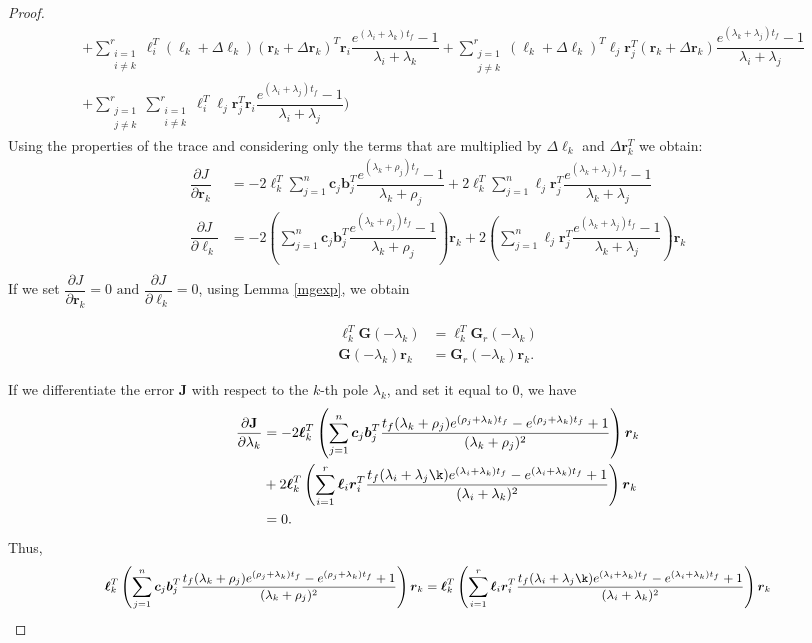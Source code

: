 \documentclass[preprint]{elsarticle}
\theoremstyle{definition}
\theoremstyle{definition}
\numberwithin{equation}{section}
\newcommand{\G}{\mathbf{G}}
\newcommand{\J}{\mathbf{J}}
\newcommand{\tf}{t_f}
\newcommand{\rc}{\boldsymbol{r}}
\newcommand{\lc}{\boldsymbol{\ell}}
\newcommand{\cc}{\boldsymbol{c}}
\newcommand{\bb}{\boldsymbol{b}}
\newcommand{\pder}[2][]{\dfrac{\partial#1}{\partial#2}}
\begin{document}
\begin{proof}
\begin{align*}
&+\sum_{\substack{i=1 \\i \neq k}}^r\lc_{i}^T(\lc_{k}+\Delta\lc_{k})(\rc_{k}+\Delta\rc_{k})^T\rc_{i}\dfrac{e^{(\lambda_i+\lambda_k){\tf}}-1}{\lambda_i+\lambda_k}+                             
\sum_{\substack{j=1\\j\neq k}}^r(\lc_{k}+\Delta\lc_{k})^T\lc_{j}\rc_{j}^T(\rc_{k}+\Delta\rc_{k})\dfrac{e^{(\lambda_k+\lambda_j){\tf}}-1}{\lambda_i+\lambda_j}\\
&+\sum_{\substack{j=1\\j\neq k}}^r\sum_{\substack{i=1\\i\neq k}}^r\lc_{i}^T\lc_{j}\rc_{j}^T\rc_{i}\dfrac{e^{(\lambda_i+\lambda_j){\tf}}-1}{\lambda_i+\lambda_j}\Bigg)
\end{align*}
Using the properties of the trace and considering only the terms that are multiplied by $\Delta\lc_{k}$ and $\Delta\rc_{k}^T$ we obtain:
\begin{align*}
\dfrac{\partial J}{\partial \rc_{k}}&=-2\lc_k^T\sum_{j=1}^n\cc_j\bb_j^T\dfrac{e^{(\lambda_k+\rho_j){\tf}}-1}{\lambda_k+\rho_j}+2\lc_k^T\sum_{j=1}^n\lc_j\rc_j^T\dfrac{e^{(\lambda_k+\lambda_j){\tf}}-1}{\lambda_k+\lambda_j}\\
\dfrac{\partial J}{\partial \lc_{k}}&=-2\left (\sum_{j=1}^n\cc_j\bb_j^T\dfrac{e^{(\lambda_k+\rho_j){\tf}}-1}{\lambda_k+\rho_j}\right)\rc_k+2\left(\sum_{j=1}^n\lc_j\rc_j^T\dfrac{e^{(\lambda_k+\lambda_j){\tf}}-1}{\lambda_k+\lambda_j}\right)\rc_k\\
\end{align*}
If we set  $\dfrac{\partial J}{\partial \rc_{k}}=0   \text{ and }\dfrac{\partial J}{\partial \lc_{k}}=0 $, using Lemma \ref{mgexp},  we obtain 

\begin{align*}
\lc_k^T\G(-\lambda_k)&=\lc_k^T\G_r(-\lambda_k)\\
\G(-\lambda_k)\rc_k&=\G_r(-\lambda_k)\rc_k.
\end{align*}

If we differentiate the error $\J$ with respect to the $k$-th pole $\lambda_k$, and set it equal to $0$,  we have
\begin{align*}
\pder[\J]{\lambda_k}&=-2\lc_k^T\left(\sum_{j=1}^n \cc_j\bb_j^T \dfrac{{\tf}(\lambda_k+\rho_j)e^{(\rho_j+\lambda_k){\tf}}-e^{(\rho_j+\lambda_k){\tf}}+1}{(\lambda_k+\rho_j)^2}\right)\rc_k\\
&+2\lc_k^T \left(\sum^r_{i=1} \lc_i\rc_i^T\dfrac{{\tf}(\lambda_i+\lambda_j\k)e^{(\lambda_i+\lambda_k){\tf}}-e^{(\lambda_i+\lambda_k){\tf}}+1}{(\lambda_i+\lambda_k)^2}\right)\rc_k\\
&=0.
\end{align*}
Thus,
\begin{align*}\small
\lc_k^T\left(\sum_{j=1}^n \cc_j\bb_j^T \dfrac{{\tf}(\lambda_k+\rho_j)e^{(\rho_j+\lambda_k){\tf}}-e^{(\rho_j+\lambda_k){\tf}}+1}{(\lambda_k+\rho_j)^2}\right)\rc_k=\lc_k^T \left(\sum^r_{i=1} \lc_i\rc_i^T\dfrac{{\tf}(\lambda_i+\lambda_j\k)e^{(\lambda_i+\lambda_k){\tf}}-e^{(\lambda_i+\lambda_k){\tf}}+1}{(\lambda_i+\lambda_k)^2}\right)\rc_k\\
\end{align*}


\end{proof}
\end{document}
